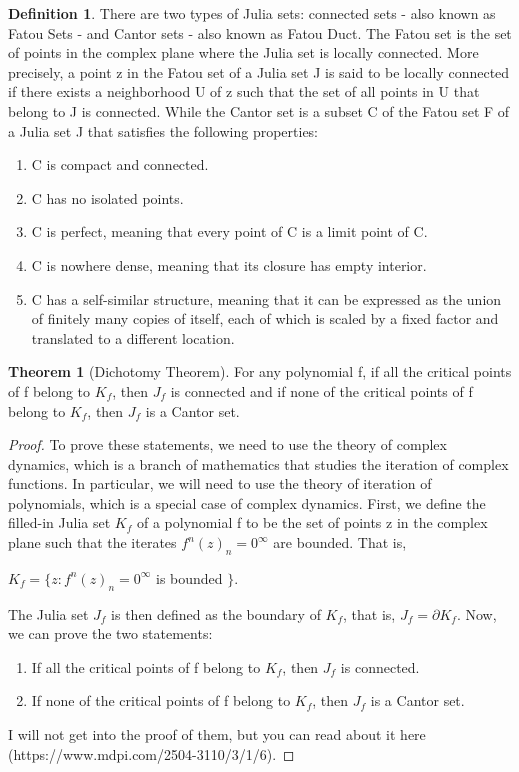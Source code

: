 \documentclass[a4paper,11pt]{article}
\theoremstyle{definition}
\newtheorem{theorem}{Theorem}[section]
\newtheorem{defn}{Definition}[section]%
\numberwithin{equation}{section} %
\begin{document}
\begin{defn}
    There are two types of Julia sets: connected sets - also known as Fatou Sets - and Cantor sets - also known as Fatou Duct.
    The Fatou set is the set of points in the complex plane where the Julia set is locally connected. More precisely, a point z in the Fatou set of a Julia set J is said to be locally connected if there exists a neighborhood U of z such that the set of all points in U that belong to J is connected.
    While the Cantor set is a subset C of the Fatou set F of a Julia set J that satisfies the following properties:
    \begin{enumerate}
        \item C is compact and connected.
        \item C has no isolated points.
        \item C is perfect, meaning that every point of C is a limit point of C.
        \item C is nowhere dense, meaning that its closure has empty interior.
        \item C has a self-similar structure, meaning that it can be expressed as the union of finitely many copies of itself, each of which is scaled by a fixed factor and translated to a different location.
    \end{enumerate}

\end{defn}


\begin{theorem}[Dichotomy Theorem]
    For any polynomial f, if all the critical points of f belong to $K_f$, then $J_f$ is connected and if none of the critical points of f belong to $K_f$, then $J_f$ is a Cantor set.
\end{theorem}
\begin{proof}
    To prove these statements, we need to use the theory of complex dynamics, which is a branch of mathematics that studies the iteration of complex functions. In particular, we will need to use the theory of iteration of polynomials, which is a special case of complex dynamics.
    First, we define the filled-in Julia set $K_f$ of a polynomial f to be the set of points z in the complex plane such that the iterates ${f^n(z)}_n = 0^{\infty}$ are bounded. That is,
    \begin{center}
        $K_f = \{ z : {f^n(z)}_n = 0^{\infty} $ is bounded $ \}$.
    \end{center}
    The Julia set $J_f$ is then defined as the boundary of $K_f$, that is, $J_f = \partial K_f$.
    Now, we can prove the two statements:
    \begin{enumerate}
        \item If all the critical points of f belong to $K_f$, then $J_f$ is connected.
        \item If none of the critical points of f belong to $K_f$, then $J_f$ is a Cantor set.
    \end{enumerate}
    I will not get into the proof of them, but you can read about it here (https://www.mdpi.com/2504-3110/3/1/6).

\end{proof}
\end{document}
